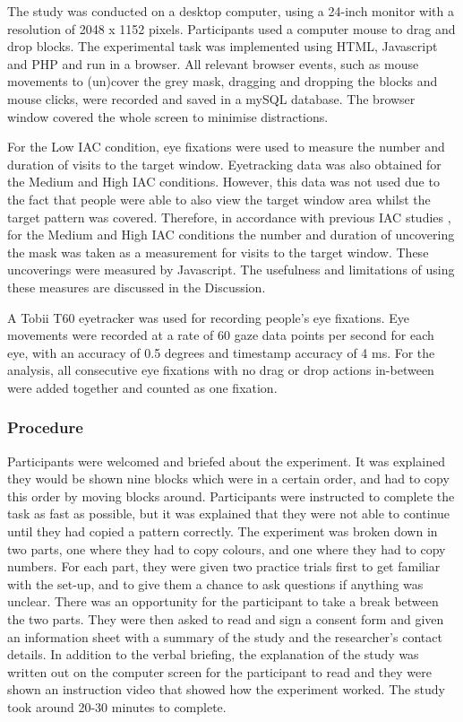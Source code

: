 \documentclass[11pt,oneside]{report}
\begin{document}
The study was conducted on a desktop computer, using a 24-inch monitor with a resolution of 2048 x 1152 pixels. Participants used a computer mouse to drag and drop blocks. The experimental task was implemented using HTML, Javascript and PHP and run in a browser.  All relevant browser events, such as mouse movements to (un)cover the grey mask, dragging and dropping the blocks and mouse clicks, were recorded and saved in a mySQL database. The browser window covered the whole screen to minimise distractions.

For the Low IAC condition, eye fixations were used to measure the number and duration of visits to the target window. Eyetracking data was also obtained for the Medium and High IAC conditions. However, this data was not used due to the fact that people were able to also view the target window area whilst the target pattern was covered. Therefore, in accordance with previous IAC studies \citep[e.g.][]{Gray2004}, for the Medium and High IAC conditions the number and duration of uncovering the mask was taken as a measurement for visits to the target window.  These uncoverings were measured by Javascript. The usefulness and limitations of using these measures are discussed in the Discussion.

A Tobii T60 eyetracker was used for recording people's eye fixations. Eye movements were recorded at a rate of 60 gaze data points per second for each eye, with an accuracy of 0.5 degrees and timestamp accuracy of 4 ms. For the analysis, all consecutive eye fixations with no drag or drop actions in-between were added together and counted as one fixation.

\subsubsection{Procedure}
Participants were welcomed and briefed about the experiment. It was explained they would be shown nine blocks which were in a certain order, and had to copy this order by moving blocks around. Participants were instructed to complete the task as fast as possible, but it was explained that they were not able to continue until they had copied a pattern correctly. 
The experiment was broken down in two parts, one where they had to copy colours, and one where they had to copy numbers. For each part, they were given two practice trials first to get familiar with the set-up, and to give them a chance to ask questions if anything was unclear. There was an opportunity for the participant to take a break between the two parts. 
They were then asked to read and sign a consent form and given an information sheet with a summary of the study and the researcher's contact details. In addition to the verbal briefing, the explanation of the study was written out on the computer screen for the participant to read and they were shown an instruction video that showed how the experiment worked. The study took around 20-30 minutes to complete.
\end{document}
